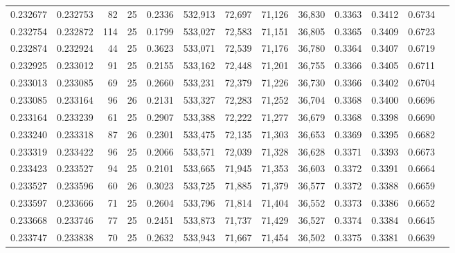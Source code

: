 \begin{tabular}{rrrrrrrrrrrrr}
0.232677 & 0.232753 &    82 &  25 &                                     0.2336 & 532,913 &  72,697 &  71,126 &  36,830 & 0.3363 & 0.3412 & 0.6734 \\
0.232754 & 0.232872 &   114 &  25 &                                     0.1799 & 533,027 &  72,583 &  71,151 &  36,805 & 0.3365 & 0.3409 & 0.6723 \\
0.232874 & 0.232924 &    44 &  25 &                                     0.3623 & 533,071 &  72,539 &  71,176 &  36,780 & 0.3364 & 0.3407 & 0.6719 \\
0.232925 & 0.233012 &    91 &  25 &                                     0.2155 & 533,162 &  72,448 &  71,201 &  36,755 & 0.3366 & 0.3405 & 0.6711 \\
0.233013 & 0.233085 &    69 &  25 &                                     0.2660 & 533,231 &  72,379 &  71,226 &  36,730 & 0.3366 & 0.3402 & 0.6704 \\
0.233085 & 0.233164 &    96 &  26 &                                     0.2131 & 533,327 &  72,283 &  71,252 &  36,704 & 0.3368 & 0.3400 & 0.6696 \\
0.233164 & 0.233239 &    61 &  25 &                                     0.2907 & 533,388 &  72,222 &  71,277 &  36,679 & 0.3368 & 0.3398 & 0.6690 \\
0.233240 & 0.233318 &    87 &  26 &                                     0.2301 & 533,475 &  72,135 &  71,303 &  36,653 & 0.3369 & 0.3395 & 0.6682 \\
0.233319 & 0.233422 &    96 &  25 &                                     0.2066 & 533,571 &  72,039 &  71,328 &  36,628 & 0.3371 & 0.3393 & 0.6673 \\
0.233423 & 0.233527 &    94 &  25 &                                     0.2101 & 533,665 &  71,945 &  71,353 &  36,603 & 0.3372 & 0.3391 & 0.6664 \\
0.233527 & 0.233596 &    60 &  26 &                                     0.3023 & 533,725 &  71,885 &  71,379 &  36,577 & 0.3372 & 0.3388 & 0.6659 \\
0.233597 & 0.233666 &    71 &  25 &                                     0.2604 & 533,796 &  71,814 &  71,404 &  36,552 & 0.3373 & 0.3386 & 0.6652 \\
0.233668 & 0.233746 &    77 &  25 &                                     0.2451 & 533,873 &  71,737 &  71,429 &  36,527 & 0.3374 & 0.3384 & 0.6645 \\
0.233747 & 0.233838 &    70 &  25 &                                     0.2632 & 533,943 &  71,667 &  71,454 &  36,502 & 0.3375 & 0.3381 & 0.6639 \\

\end{tabular}
